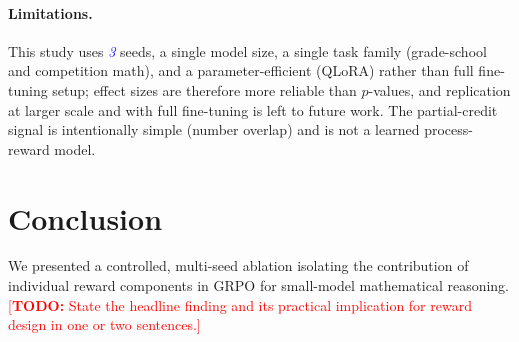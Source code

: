 \documentclass[11pt]{article}
\newcommand{\todo}[1]{\textcolor{red}{[\textbf{TODO:} #1]}}
\newcommand{\res}[1]{\textcolor{blue}{\textit{#1}}}   %
\begin{document}
\paragraph{Limitations.}
This study uses \res{3} seeds, a single model size, a single task family
(grade-school and competition math), and a parameter-efficient (QLoRA) rather
than full fine-tuning setup; effect sizes are therefore more reliable than
$p$-values, and replication at larger scale and with full fine-tuning is left to
future work. The partial-credit signal is intentionally simple (number overlap)
and is not a learned process-reward model.

\section{Conclusion}
We presented a controlled, multi-seed ablation isolating the contribution of
individual reward components in GRPO for small-model mathematical reasoning.
\todo{State the headline finding and its practical implication for reward design
in one or two sentences.}



\end{document}
